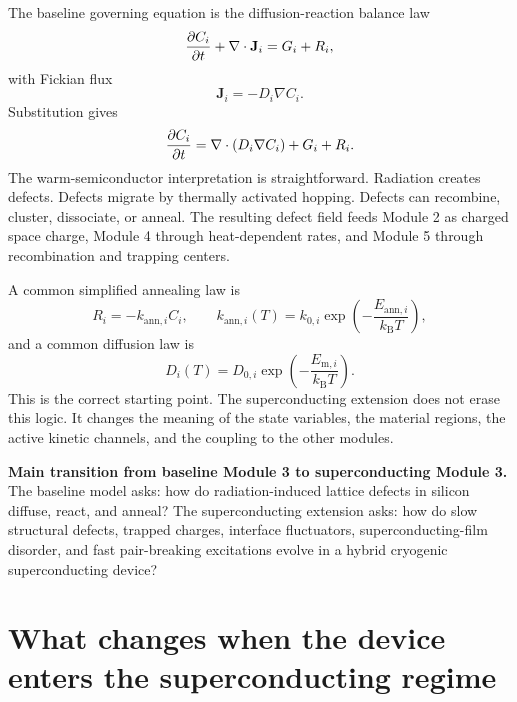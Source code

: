 \documentclass[11pt]{article}
\newcommand{\Jdef}{\mathbf{J}}
\begin{document}
The baseline governing equation is the diffusion-reaction balance law
\begin{equation}
\pdv{C_i}{t} + \nabla \cdot \Jdef_i = G_i + R_i,
\label{eq:baseline_balance}
\end{equation}
with Fickian flux
\begin{equation}
\Jdef_i = -D_i \nabla C_i.
\label{eq:fick}
\end{equation}
Substitution gives
\begin{equation}
\pdv{C_i}{t}=\nabla\cdot(D_i\nabla C_i)+G_i+R_i.
\label{eq:baseline_rd}
\end{equation}
The warm-semiconductor interpretation is straightforward. Radiation creates defects. Defects migrate by thermally activated hopping. Defects can recombine, cluster, dissociate, or anneal. The resulting defect field feeds Module 2 as charged space charge, Module 4 through heat-dependent rates, and Module 5 through recombination and trapping centers.

A common simplified annealing law is
\begin{equation}
R_i=-k_{\mathrm{ann},i} C_i,
\qquad
k_{\mathrm{ann},i}(T)=k_{0,i}\exp\left(-\frac{E_{\mathrm{ann},i}}{k_{\mathrm{B}}T}\right),
\label{eq:ann_law}
\end{equation}
and a common diffusion law is
\begin{equation}
D_i(T)=D_{0,i}\exp\left(-\frac{E_{\mathrm{m},i}}{k_{\mathrm{B}}T}\right).
\label{eq:arrheniusD}
\end{equation}
This is the correct starting point. The superconducting extension does not erase this logic. It changes the meaning of the state variables, the material regions, the active kinetic channels, and the coupling to the other modules.

\begin{physicsbox}
\textbf{Main transition from baseline Module 3 to superconducting Module 3.} The baseline model asks: how do radiation-induced lattice defects in silicon diffuse, react, and anneal? The superconducting extension asks: how do slow structural defects, trapped charges, interface fluctuators, superconducting-film disorder, and fast pair-breaking excitations evolve in a hybrid cryogenic superconducting device?
\end{physicsbox}

\section{What changes when the device enters the superconducting regime}
\end{document}
